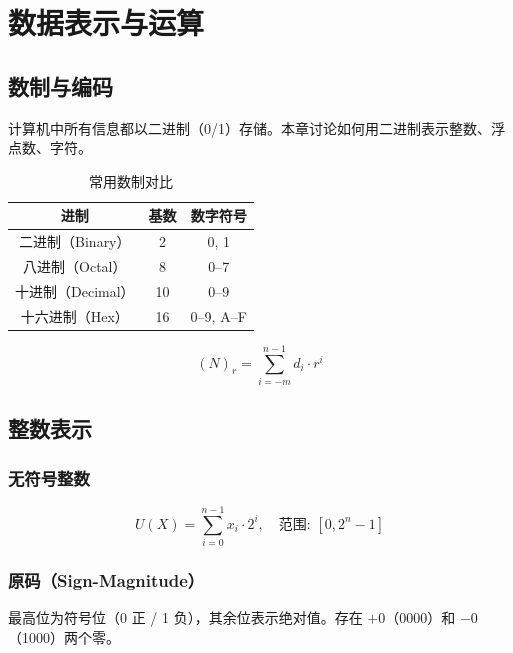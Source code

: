 \clearpage
\vspace*{\fill}
\section{数据表示与运算}
\vspace*{\fill}
\clearpage


\subsection{数制与编码}

计算机中所有信息都以二进制（0/1）存储。本章讨论如何用二进制表示整数、浮点数、字符。

\begin{table}[H]
\centering
\caption{常用数制对比}
\label{tab:number_systems}
\begin{tabulary}{\textwidth}{CCC}
\toprule
\textbf{进制} & \textbf{基数} & \textbf{数字符号} \\
\midrule
二进制（Binary） & 2 & 0, 1 \\
八进制（Octal） & 8 & 0–7 \\
十进制（Decimal） & 10 & 0–9 \\
十六进制（Hex） & 16 & 0–9, A–F \\
\bottomrule
\end{tabulary}
\end{table}

\begin{equation}
(N)_r = \sum_{i=-m}^{n-1} d_i \cdot r^i
\end{equation}

\subsection{整数表示}

\subsubsection{无符号整数}

\begin{equation}
U(X) = \sum_{i=0}^{n-1} x_i \cdot 2^i, \quad \text{范围: } [0, 2^n - 1]
\end{equation}

\subsubsection{原码（Sign-Magnitude）}

最高位为符号位（0 正 / 1 负），其余位表示绝对值。存在 $+0$（0000）和 $-0$（1000）两个零。

